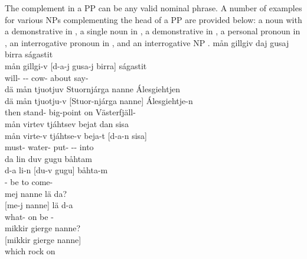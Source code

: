 The complement in a PP can be any valid nominal phrase. A number of examples for various NPs complementing the head of a PP are provided below: %
a noun with a demonstrative in , a single noun in , a demonstrative in , a personal pronoun in , an interrogative pronoun in , and an interrogative NP .
\ea\label{PPex1}%
\glll	mån gillgiv daj gusaj birra ságastit\\
	mån gillgi-v [d-a-j gusa-j {birra]\subPP} ságastit\\
	 will- -- cow- about say-\\\nopagebreak
{}	
\z
\ea\label{PPex2}%
\glll	dä mån tjuotjuv Stuornjárga nanne Álesgiehtjen\\
	dä mån tjuotju-v [Stuor-njárga {nanne]\subPP} Álesgiehtje-n\\
	then  stand- big-point\BS{} on Västerfjäll-\\\nopagebreak
{}	
\z
\ea\label{PPex3}%
\glll	mån virtev tjáhtsev bejat dan sisa\\
	mån virte-v tjáhtse-v beja-t [d-a-n {sisa]\subPP}\\
	 must- water- put- -- into\\\nopagebreak
{}	
\z
\ea\label{PPex4}%
\glll	da lin duv gugu båhtam\\
	d-a li-n [du-v {gugu]\subPP} båhta-m\\
	-\BS{} be\BS{}  to come-\\\nopagebreak
{}	
\z
\ea\label{PPex5}%
\glll	mej nanne lä da?\\
	[me-j {nanne]\subPP} lä d-a\\
	what- on be\BS{} -\BS{}\\
{}	
\z
\ea\label{PPex6}%
\glll	mikkir gierge nanne?\\
	[mikkir gierge {nanne]\subPP}\\
	which rock\BS{} on\\\nopagebreak
{}	
\z

